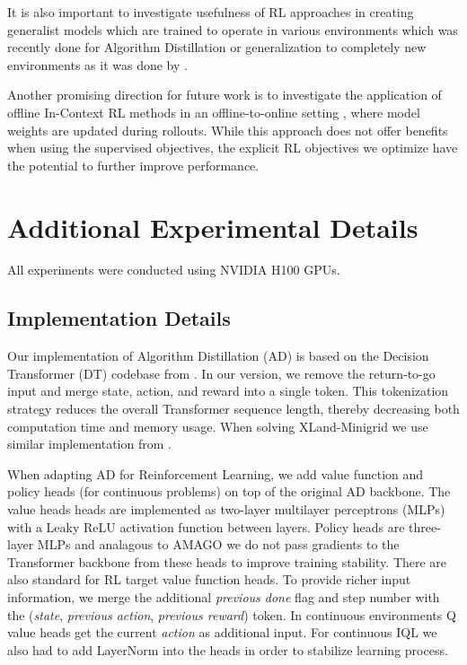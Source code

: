 \documentclass{article} %
\begin{document}
It is also important to investigate usefulness of RL approaches in creating generalist models which are trained to operate in various environments which was recently done for Algorithm Distillation \citep{polubarov2025vintixactionmodelincontext} or generalization to completely new environments as it was done by \citet{raparthy2023generalization}. 

Another promising direction for future work is to investigate the application of offline In-Context RL methods in an offline-to-online setting \citep{nair2020awac, lee2022offline}, where model weights are updated during rollouts. While this approach does not offer benefits when using the supervised objectives, the explicit RL objectives we optimize have the potential to further improve performance.

\section{Additional Experimental Details}
\label{app:details}
All experiments were conducted using NVIDIA H100 GPUs.

\subsection{Implementation Details}
Our implementation of Algorithm Distillation (AD) is based on the Decision Transformer (DT) codebase from \citet{tarasov2024corl}.  In our version, we remove the return-to-go input and merge state, action, and reward into a single token. This tokenization strategy reduces the overall Transformer sequence length, thereby decreasing both computation time and memory usage. When solving XLand-Minigrid we use similar implementation from \citet{nikulin2024xland}.

When adapting AD for Reinforcement Learning, we add value function and policy heads (for continuous problems) on top of the original AD backbone. The value heads heads are implemented as two-layer multilayer perceptrons (MLPs) with a Leaky ReLU activation function between layers. Policy heads are three-layer MLPs and analagous to AMAGO \citep{grigsby2023amago} we do not pass gradients to the Transformer backbone from these heads to improve training stability. There are also standard for RL target value function heads. To provide richer input information, we merge the additional \textit{previous done} flag and step number with the (\textit{state}, \textit{previous action}, \textit{previous reward}) token. In continuous environments Q value heads get the current \textit{action} as additional input. For continuous IQL we also had to add LayerNorm \citep{ba2016layer} into the heads in order to stabilize learning process.
\end{document}
